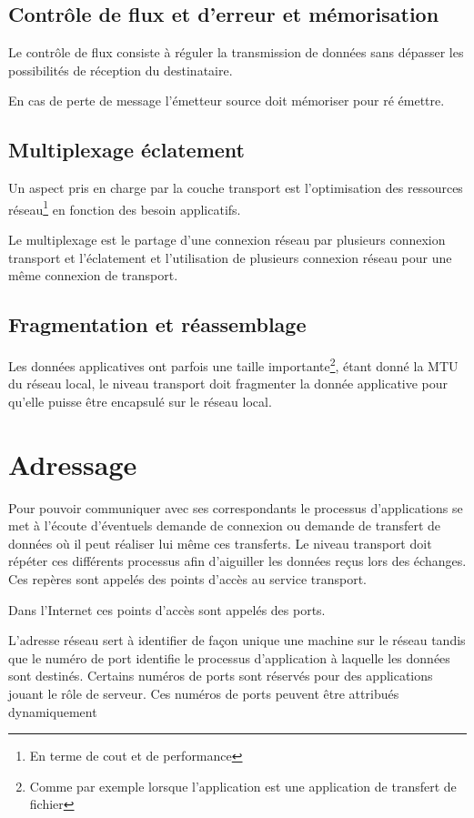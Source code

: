 \documentclass[12pt,a4paper,openany]{book}
\begin{document}
	\subsection{Contrôle de flux et d'erreur et mémorisation}
	Le contrôle de flux consiste à réguler la transmission de données sans dépasser les possibilités de réception du destinataire.

	En cas de perte de message l'émetteur source doit mémoriser pour ré émettre.
	\subsection{Multiplexage éclatement}
	Un aspect pris en charge par la couche transport est l'optimisation des ressources réseau\footnote{En terme de cout et de performance} en fonction
	des besoin applicatifs.
	
	Le multiplexage est le partage d'une connexion réseau par plusieurs connexion transport et l'éclatement et l'utilisation de plusieurs connexion
	réseau pour une même connexion de transport.

	\subsection{Fragmentation et réassemblage}
	Les données applicatives ont parfois une taille importante\footnote{Comme par exemple lorsque l'application est une application de transfert de
	fichier}, étant donné la MTU du réseau local, le niveau transport doit fragmenter la donnée applicative pour qu'elle puisse être encapsulé sur le
	réseau local.

	\section{Adressage}
	Pour pouvoir communiquer avec ses correspondants le processus d'applications se met à l'écoute d'éventuels demande de connexion ou demande de
	transfert de données où il peut réaliser lui même ces transferts.
	Le niveau transport doit répéter ces différents processus afin d'aiguiller les données reçus lors des échanges. Ces repères sont appelés des points
	d'accès au service transport.

	Dans l'Internet ces points d'accès sont appelés des ports.

	L'adresse réseau sert à identifier de façon unique une machine sur le réseau tandis que le numéro de port identifie le processus d'application à
	laquelle les données sont destinés. Certains numéros de ports sont réservés pour des applications jouant le rôle de serveur. Ces numéros de ports peuvent être attribués dynamiquement
\end{document}
